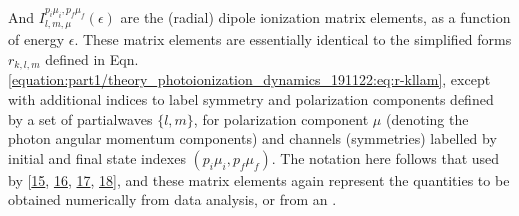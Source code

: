 \documentclass[letterpaper,table,10pt,english]{jupyterBook}
\begin{document}
\sphinxAtStartPar
And \(I_{l,m,\mu}^{p_{i}\mu_{i},p_{f}\mu_{f}}(\epsilon)\) are the (radial)
dipole ionization matrix elements, as a function of energy \(\epsilon\).
These matrix elements are essentially identical to the simplified forms
\(r_{k,l,m}\) defined in Eqn. \eqref{equation:part1/theory_photoionization_dynamics_191122:eq:r-kllam}, except with additional indices to label
symmetry and polarization components defined by a set of partial\sphinxhyphen{}waves
\(\{l,m\}\), for polarization component \(\mu\) (denoting the photon angular
momentum components) and channels (symmetries) labelled by initial and
final state indexes \((p_{i}\mu_{i},p_{f}\mu_{f})\). The notation here
follows that used by  {[}\hyperlink{cite.backmatter/bibliography:id640}{15}, \hyperlink{cite.backmatter/bibliography:id527}{16}, \hyperlink{cite.backmatter/bibliography:id671}{17}, \hyperlink{cite.backmatter/bibliography:id643}{18}{]}, and these matrix elements again represent the quantities to be obtained numerically from data analysis, or from an .
\end{document}

